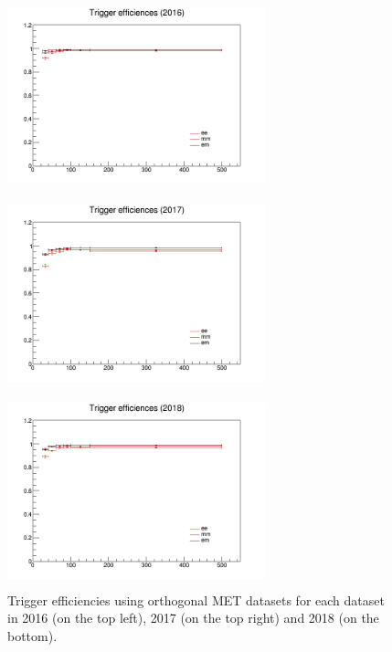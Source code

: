 \documentclass[a4paper, 10pt, openright]{report}
\begin{document}
\begin{figure}[htbp]
\begin{center}
\begin{minipage}[b]{.49\textwidth}
\begin{center}
\includegraphics[width=7.5cm, height=5.6cm]{figs/Efficiency_pt_2016_2016.png}
\end{center}
\end{minipage} \hfill
\begin{minipage}[b]{.49\textwidth}
\begin{center}
\includegraphics[width=7.5cm, height=5.6cm]{figs/Efficiency_pt_2017_2017.png}
\end{center}
\end{minipage} \hfill
\begin{minipage}[b]{.99\textwidth}
\begin{center}
\includegraphics[width=7.5cm, height=5.6cm]{figs/Efficiency_pt_2018_2018.png}
\end{center}
\end{minipage} \hfill
\caption{Trigger efficiencies using orthogonal \ac{MET} datasets for each dataset in 2016 (on the top left), 2017 (on the top right) and 2018 (on the bottom).}
\label{fig:TriggEff}
\end{center}
\end{figure}
\end{document}
